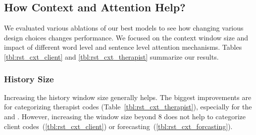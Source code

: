 \subsection{How Context and Attention Help?}
\label{ssec:snt:abl_context_attention}

We evaluated various ablations of our best models to see how
changing various design choices changes performance. We focused on
the context window size and impact of different word level and
sentence level attention mechanisms. Tables \ref{tbl:rst_cxt_client}
and \ref{tbl:rst_cxt_therapist} summarize our results.

\subsubsection{History Size}
\label{sssec:snt:history-size}
Increasing the history window size generally helps. The biggest
improvements are for categorizing therapist codes
(Table~\ref{tbl:rst_cxt_therapist}), especially for the \RES and
\REC. However, increasing the window size beyond 8 does not help
to categorize client codes~(\autoref{tbl:rst_cxt_client}) or
forecasting~(\autoref{tbl:rst_cxt_forcasting}).

